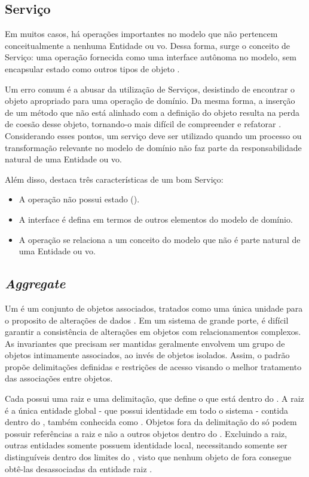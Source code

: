 \subsection{Serviço}
Em muitos casos, há operações importantes no modelo que não pertencem conceitualmente a nenhuma Entidade ou \acrshort{vo}. Dessa forma, surge o conceito de Serviço: uma operação fornecida como uma interface autônoma no modelo, sem encapsular estado como outros tipos de objeto \cite{evans2004ddd}.

Um erro comum é a abusar da utilização de Serviços, desistindo de encontrar o objeto apropriado para uma operação de domínio. Da mesma forma, a inserção de um método que não está alinhado com a definição do objeto resulta na perda de coesão desse objeto, tornando-o mais difícil de compreender e refatorar \cite{evans2004ddd}. Considerando esses pontos, um serviço deve ser utilizado quando um processo ou transformação relevante no modelo de domínio não faz parte da responsabilidade natural de uma Entidade ou \acrshort{vo}.

Além disso,  destaca três características de um bom Serviço:
\begin{itemize}
    \item A operação não possui estado ().
    \item A interface é defina em termos de outros elementos do modelo de domínio.
    \item A operação se relaciona a um conceito do modelo que não é parte natural de uma Entidade ou \acrshort{vo}.
\end{itemize}

\subsection{\textit{Aggregate}}
\label{section:aggregate}
Um  é um conjunto de objetos associados, tratados como uma única unidade para o proposito de alterações de dados \cite{evans2004ddd}. Em um sistema de grande porte, é difícil garantir a consistência de alterações em objetos com relacionamentos complexos. As invariantes que precisam ser mantidas geralmente envolvem um grupo de objetos intimamente associados, ao invés de objetos isolados. Assim, o padrão  propõe delimitações definidas e restrições de acesso visando o melhor tratamento das associações entre objetos.

Cada  possui uma raiz e uma delimitação, que define o que está dentro do  \cite{evans2004ddd}. A raiz é a única entidade global - que possui identidade em todo o sistema - contida dentro do , também conhecida como  \cite{evans2004ddd}. Objetos fora da delimitação do  só podem possuir referências a raiz e não a outros objetos dentro do . Excluindo a raiz, outras entidades somente possuem identidade local, necessitando somente ser distinguíveis dentro dos limites do , visto que nenhum objeto de fora consegue obtê-las desassociadas da entidade raiz \cite{evans2004ddd}.

